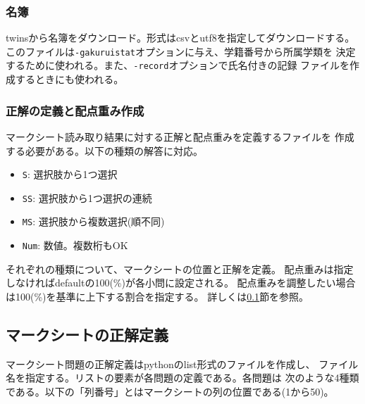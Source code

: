 \subsubsection{名簿}
\label{名簿}

twinsから名簿をダウンロード。形式はcsvとutf8を指定してダウンロードする。
このファイルは\texttt{-gakuruistat}オプションに与え、学籍番号から所属学類を
決定するために使われる。また、\texttt{-record}オプションで氏名付きの記録
ファイルを作成するときにも使われる。

\subsubsection{正解の定義と配点重み作成}
\label{正解の定義と配点重み作成}

マークシート読み取り結果に対する正解と配点重みを定義するファイルを
作成する必要がある。以下の種類の解答に対応。

\begin{itemize}
\item \texttt{S}: 選択肢から1つ選択

\item \texttt{SS}: 選択肢から1つ選択の連続

\item \texttt{MS}: 選択肢から複数選択(順不同)

\item \texttt{Num}: 数値。複数桁もOK

\end{itemize}
それぞれの種類について、マークシートの位置と正解を定義。
配点重みは指定しなければdefaultの100(\%)が各小問に設定される。
配点重みを調整したい場合は100(\%)を基準に上下する割合を指定する。
詳しくは\ref{mksheet-ref}節を参照。

\subsection{マークシートの正解定義}
\label{mksheet-ref}

マークシート問題の正解定義はpythonのlist形式のファイルを作成し、
ファイル名を指定する。リストの要素が各問題の定義である。各問題は
次のような4種類である。以下の「列番号」とはマークシートの列の位置である(1から50)。

